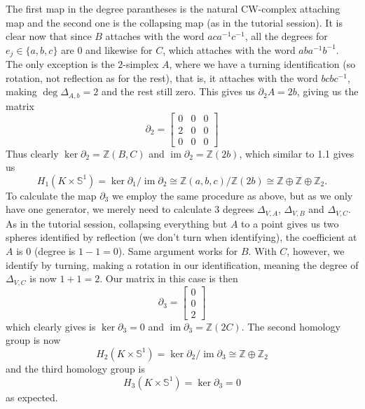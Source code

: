 \documentclass[a4paper, 12pt]{article}
\DeclareMathOperator{\im}{im}
\renewcommand{\S}{\mathbb{S}}
\newcommand{\Z}{\mathbb{Z}}
\newcommand{\iso}{\cong}
\begin{document}
\begin{enumerate}
\[	\]
	The first map in the degree parantheses is the natural CW-complex attaching map and the second one is the collapsing map (as in the tutorial session). It is clear now that since $B$ attaches with the word $aca^{-1}c^{-1}$, all the degrees for $e_j \in \lbrace a, b, c \rbrace$ are $0$ and likewise for $C$, which attaches with the word $aba^{-1}b^{-1}$. The only exception is the $2$-simplex $A$, where we have a turning identification (so rotation, not reflection as for the rest), that is, it attaches with the word $bcbc^{-1}$, making $\deg\Delta_{A, b} = 2$ and the rest still zero. This gives us $\partial_2 A = 2b$, giving us the matrix
	\[
	\partial_2 =
	\begin{bmatrix}
	0 & 0 & 0 \\
	2 & 0 & 0 \\
	0 & 0 & 0
	\end{bmatrix}
	\]
	Thus clearly $\ker\partial_2 = \Z(B, C)$ and $\im\partial_2 = \Z(2b)$, which similar to 1.1 gives us
	\[
	H_1(K \times\S^1) = \ker\partial_1 / \im\partial_2 \iso \Z(a, b, c)/\Z(2b) \iso \Z\oplus\Z\oplus\Z_2.
	\]
	To calculate the map $\partial_3$ we employ the same procedure as above, but as we only have one generator, we merely need to calculate $3$ degrees $\Delta_{V,A}$, $\Delta_{V,B}$ and $\Delta_{V,C}$. As in the tutorial session, collapsing everything but $A$ to a point gives us two spheres identified by reflection (we don't turn when identifying), the coefficient at $A$ is $0$ (degree is $1 - 1 = 0$). Same argument works for $B$. With $C$, however, we identify by turning, making a rotation in our identification, meaning the degree of $\Delta_{V,C}$ is now $1 + 1 = 2$. Our matrix in this case is then
	\[
	\partial_3 = 
	\begin{bmatrix}
	0 \\ 0 \\ 2
	\end{bmatrix}
	\]
	which clearly gives is $\ker\partial_3 = 0$ and $\im\partial_3 = \Z(2C)$. The second homology group is now
	\[
	H_2(K\times\S^1) = \ker\partial_2 / \im\partial_3 \iso \Z \oplus \Z_2
	\]
	and the third homology group is
	\[
	H_3(K\times\S^1) = \ker\partial_3 = 0
	\]
	as expected.
	

\end{enumerate}
\end{document}
